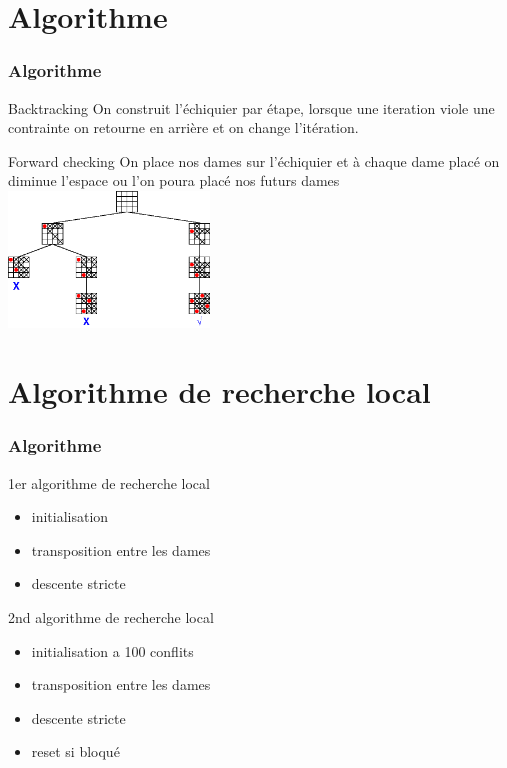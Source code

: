 \documentclass[10pt,a4paper]{beamer}
\begin{document}
\section{Algorithme}
\begin{frame}
	\frametitle{Algorithme}

	\begin{block}{Backtracking}
		On construit l'échiquier par étape, lorsque une iteration viole une contrainte on retourne en arrière et on change l'itération.
	\end{block}



	\begin{block}{Forward checking}
		On place nos dames sur l'échiquier et à chaque dame placé on diminue l'espace ou l'on poura placé nos futurs dames \\
		\includegraphics[width=0.4\textwidth]{images/forw.png}
	\end{block}

\end{frame}


\section{Algorithme de recherche local}
\begin{frame}
	\frametitle{Algorithme}

	\begin{block}{1er algorithme de recherche local}
		\begin{itemize}
			\item{initialisation}
			\item{transposition entre les dames}
			\item{descente stricte}
		\end{itemize}
	\end{block}

	\begin{block}{2nd algorithme de recherche local}
		\begin{itemize}
		      \item{initialisation a 100 conflits}
		      \item{transposition entre les dames}
		      \item{descente stricte}
		      \item{reset si bloqué}
	      \end{itemize}
	\end{block}


\end{frame}
\end{document}
